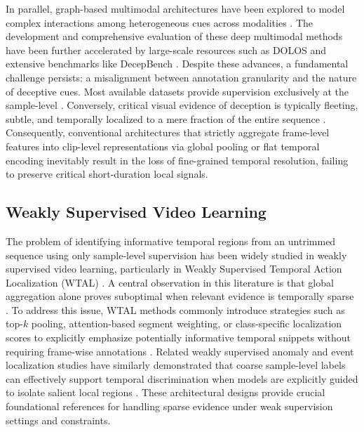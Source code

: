 \documentclass[sigconf,screen,review,anonymous]{acmart}
\begin{document}
In parallel, graph-based multimodal architectures have been explored to model complex interactions among heterogeneous cues across modalities \cite{zhang2022fine}. The development and comprehensive evaluation of these deep multimodal methods have been further accelerated by large-scale resources such as DOLOS \cite{guo2023audio} and extensive benchmarks like DecepBench \cite{braverman2025decepbench}. 
Despite these advances, a fundamental challenge persists: a misalignment between annotation granularity and the nature of deceptive cues. Most available datasets provide supervision exclusively at the sample-level \cite{perez2015deception, guo2023audio}. Conversely, critical visual evidence of deception is typically fleeting, subtle, and temporally localized to a mere fraction of the entire sequence \cite{ding2019face, nam2023facialcuenet, biccer2025decepticon}. Consequently, conventional architectures that strictly aggregate frame-level features into clip-level representations via global pooling or flat temporal encoding inevitably result in the loss of fine-grained temporal resolution, failing to preserve critical short-duration local signals.

\subsection{Weakly Supervised Video Learning}
The problem of identifying informative temporal regions from an untrimmed sequence using only sample-level supervision has been widely studied in weakly supervised video learning, particularly in Weakly Supervised Temporal Action Localization (WTAL) \cite{wang2017untrimmednets, sultani2018real, li2023weakly}. A central observation in this literature is that global aggregation alone proves suboptimal when relevant evidence is temporally sparse \cite{wang2017untrimmednets, li2023weakly, shou2018autoloc}. To address this issue, WTAL methods commonly introduce strategies such as top-$k$ pooling, attention-based segment weighting, or class-specific localization scores to explicitly emphasize potentially informative temporal snippets without requiring frame-wise annotations \cite{wang2017untrimmednets, nguyen2018weakly, paul2018w}. Related weakly supervised anomaly and event localization studies have similarly demonstrated that coarse sample-level labels can effectively support temporal discrimination when models are explicitly guided to isolate salient local regions \cite{sultani2018real, li2023weakly, lee2020background}. These architectural designs provide crucial foundational references for handling sparse evidence under weak supervision settings and constraints.
\end{document}
